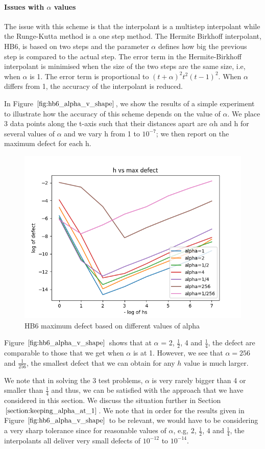 \paragraph{Issues with $\alpha$ values}
The issue with this scheme is that the interpolant is a multistep interpolant while the Runge-Kutta method is a one step method. The Hermite Birkhoff interpolant, HB6, is based on two steps and the parameter $\alpha$ defines how big the previous step is compared to the actual step. The error term in the Hermite-Birkhoff interpolant is minimised when the size of the two steps are the same size, i.e, when $\alpha$ is 1. The error term is proportional to $(t + \alpha)^2t^2(t - 1)^2$. When $\alpha$ differs from 1, the accuracy of the interpolant is reduced.

In Figure $\ref{fig:hb6_alpha_v_shape}$, we show the results of a simple experiment to illustrate how the accuracy of this scheme depends on the value of $\alpha$. We place 3 data points along the t-axis such that their distances apart are $\alpha$h and h for several values of $\alpha$ and we vary h from 1 to $10^{-7}$; we then report on the maximum defect for each h.

\begin{figure}[H]
\centering
\includegraphics[width=0.7\linewidth]{./figures/hb6_alpha_v_shape}
\caption{HB6 maximum defect based on different values of alpha}
\label{fig:hb6_alpha_v_shape}
\end{figure}

Figure $\ref{fig:hb6_alpha_v_shape}$ shows that at $\alpha$ = 2, $\frac{1}{2}$, 4 and $\frac{1}{4}$, the defect are comparable to those that we get when $\alpha$ is at 1. However, we see that $\alpha = 256$ and $\frac{1}{256}$, the smallest defect that we can obtain for any $h$ value is much larger.

We note that in solving the 3 test problems, $\alpha$ is very rarely bigger than 4 or smaller than $\frac{1}{4}$ and thus, we can be satisfied with the approach that we have considered in this section. We discuss the situation further in Section $\ref{section:keeping_alpha_at_1}$. We note that in order for the results given in Figure $\ref{fig:hb6_alpha_v_shape}$ to be relevant, we would have to be considering a very sharp tolerance since for reasonable values of $\alpha$, e.g, $2$, $\frac{1}{2}$, $4$ and $\frac{1}{4}$, the interpolants all deliver very small defects of $10^{-12}$ to $10^{-14}$.

